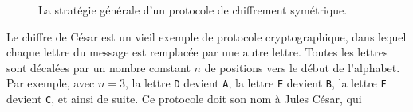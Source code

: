 \begin{figure}
  \centering
  \caption{La stratégie générale d'un protocole de chiffrement symétrique.}
  \label{fig:crypto-sym}
\end{figure}
Le chiffre de César est un vieil exemple de protocole cryptographique, dans lequel
chaque lettre du message est remplacée par une autre lettre. Toutes les lettres
sont décalées par un nombre constant $n$ de positions vers le début de
l'alphabet. Par exemple, avec $n=3$, la lettre \texttt{D} devient \texttt{A}, la
lettre \texttt{E} devient \texttt{B}, la lettre \texttt{F} devient
\texttt{C}, et ainsi de suite. Ce protocole doit son nom à Jules César, qui
